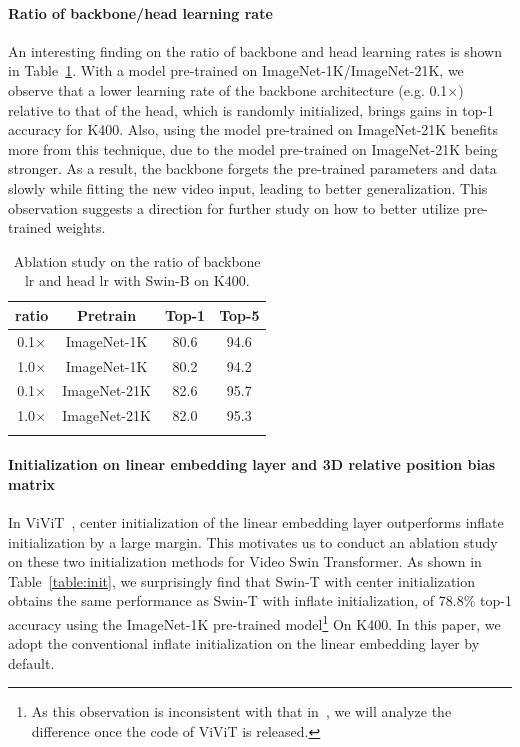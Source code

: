 \documentclass{article}
\begin{document}
\paragraph{Ratio of backbone/head learning rate} An interesting finding on the ratio of backbone and head learning rates is shown in Table~\ref{tab:lr}.
With a model pre-trained on ImageNet-1K/ImageNet-21K, we observe that a lower learning rate of the backbone architecture (e.g. 0.1$\times$) relative to that of the head, which is randomly initialized, brings gains in top-1 accuracy for K400. 
Also, using the model pre-trained on ImageNet-21K benefits more from this technique, due to the model pre-trained on ImageNet-21K being stronger. 
As a result, the backbone forgets the pre-trained parameters and data slowly while fitting the new video input, leading to better generalization. This observation suggests a direction for further study on how to better utilize pre-trained weights.

\begin{table}[h]
    \centering
    \caption{Ablation study on the ratio of backbone lr and head lr with Swin-B on K400.}
\centering
  \begin{tabular}{cc|cc}
  \Xhline{1.0pt}
  ratio  & Pretrain & Top-1 & Top-5 \\
  \hline
   0.1$\times$ & ImageNet-1K & 80.6 & 94.6\\
   1.0$\times$ & ImageNet-1K & 80.2 & 94.2\\
   0.1$\times$ & ImageNet-21K & 82.6 & 95.7\\
   1.0$\times$ & ImageNet-21K & 82.0 & 95.3\\
  \Xhline{1.0pt}
  \end{tabular}
  \label{tab:lr}
\end{table}


\paragraph{Initialization on linear embedding layer and 3D relative position bias matrix} In ViViT~\cite{arnab2021vivit}, center initialization of the linear embedding layer outperforms inflate initialization by a large margin. This motivates us to conduct an ablation study on these two initialization methods for Video Swin Transformer. 
As shown in Table~\ref{table:init}, we surprisingly find that Swin-T with center initialization obtains the same performance as Swin-T with inflate initialization, of 78.8\% top-1 accuracy using the ImageNet-1K pre-trained model\footnote{As this observation is inconsistent with that in~\cite{arnab2021vivit}, we will analyze the difference once the code of ViViT is released.} On K400.
In this paper, we adopt the conventional inflate initialization on the linear embedding layer by default.
\end{document}
